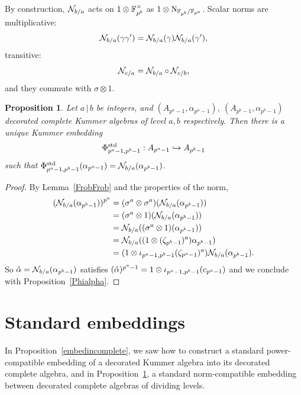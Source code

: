 \documentclass{sig-alternate}
\newtheorem{proposition}[theorem]{Proposition}
\begin{document}
By construction, $\mathcal{N}_{b/a}$ acts on $1\otimes\mathbb{F}_{p^b}^\times$ as $1\otimes\operatorname{N}_{\mathbb{F}_{p^b}/\mathbb{F}_{p^a}}$.
Scalar norms are multiplicative:
\[
  \mathcal{N}_{b/a}(\gamma\gamma')=\mathcal{N}_{b/a}(\gamma)\mathcal{N}_{b/a}(\gamma'),
\]
transitive: \[ \mathcal{N}_{c/a} = \mathcal{N}_{b/a}\circ\mathcal{N}_{c/b},\] and they
commute with $\sigma\otimes1$.
\begin{proposition}
\label{embedcomplete}
Let $a\,|\,b$ be integers,
and $(A_{p^a-1},\alpha_{p^a-1})$, $(A_{p^b-1},\alpha_{p^b-1})$ decorated complete Kummer algebras
of level $a,b$ respectively.
Then there is a unique Kummer embedding
\[ {\Phi^{\mathrm{std}}_{{p^a-1},{p^b-1}}}:A_{p^a-1}\hookrightarrow A_{p^b-1} \]
such that ${\Phi^{\mathrm{std}}_{{p^a-1},{p^b-1}}}(\alpha_{p^a-1})=\mathcal{N}_{b/a}(\alpha_{p^b-1})$.
\end{proposition}
\begin{proof}
By Lemma~\ref{FrobFrob} and the properties of the norm,
\begin{equation*}
\begin{split}
(\mathcal{N}_{b/a}(\alpha_{p^b-1}))^{p^a}&=(\sigma^a\otimes\sigma^a)(\mathcal{N}_{b/a}(\alpha_{p^b-1}))\\
&=(\sigma^a\otimes1)(\mathcal{N}_{b/a}(\alpha_{p^b-1}))\\
&=\mathcal{N}_{b/a}((\sigma^a\otimes1)(\alpha_{p^b-1}))\\
&=\mathcal{N}_{b/a}((1\otimes(\zeta_{p^b-1})^a)\alpha_{p^b-1})\\
&=(1\otimes{\iota_{{p^a-1},{p^b-1}}}(\zeta_{p^a-1})^a)\mathcal{N}_{b/a}(\alpha_{p^b-1}).
\end{split}
\end{equation*}
So $\hat\alpha=\mathcal{N}_{b/a}(\alpha_{p^b-1})$
satisfies $(\hat{\alpha})^{p^a-1}=1\otimes{\iota_{{p^a-1},{p^b-1}}}(c_{p^a-1})$
and we conclude with Proposition~\ref{Phialpha}.
\end{proof}



\section{Standard embeddings}
\label{sec:construction}

In Proposition~\ref{embedincomplete}, we saw how to construct a standard
power-compatible embedding of a decorated Kummer algebra into
its decorated complete algebra,
and in Proposition~\ref{embedcomplete}, a standard
norm-compatible embedding between decorated complete algebras
of dividing levels.
 
\end{document}
